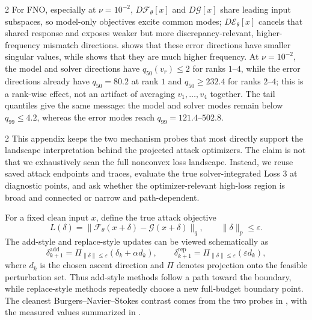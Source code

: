 \begin{multicols}{2}
For FNO, especially at $\nu=10^{-2}$, $D\mathcal{F}_\theta[x]$ and
$D\mathcal{G}[x]$ share leading input subspaces, so model-only objectives excite
common modes; $D\mathcal{E}_\theta[x]$ cancels that shared response and exposes
weaker but more discrepancy-relevant, higher-frequency mismatch directions.
 shows that these error directions have
smaller singular values, while  shows that they
are much higher frequency. At $\nu=10^{-2}$, the model and solver directions have
$q_{50}(v_r)\le 2$ for ranks $1$--$4$, while the error directions already have
$q_{50}=80.2$ at rank $1$ and $q_{50}\ge 232.4$ for ranks $2$--$4$; this is a
rank-wise effect, not an artifact of averaging $v_1,\ldots,v_4$ together. The
tail quantiles give the same message: the model and solver modes remain below
$q_{99}\le4.2$, whereas the error modes reach $q_{99}=121.4$--$502.8$.
\end{multicols}

\clearpage
{}

\begin{multicols}{2}
This appendix keeps the two mechanism probes that most directly support the
landscape interpretation behind the projected attack optimizers.  The claim is
not that we exhaustively scan the full nonconvex loss landscape.  Instead, we
reuse saved attack endpoints and traces, evaluate the true solver-integrated
Loss 3 at diagnostic points, and ask whether the optimizer-relevant high-loss
region is broad and connected or narrow and path-dependent.

For a fixed clean input \(x\), define the true attack objective
\[
  L(\delta)
  =
  \|\mathcal{F}_{\theta}(x+\delta)-\mathcal{G}(x+\delta)\|_q ,
  \qquad
  \|\delta\|_p\le \varepsilon .
\]
The add-style and replace-style updates can be viewed schematically as
\[
  \delta^{\mathrm{add}}_{k+1}
  =
  \Pi_{\|\delta\|\le\varepsilon}(\delta_k+\alpha d_k),
  \qquad
  \delta^{\mathrm{rep}}_{k+1}
  =
  \Pi_{\|\delta\|\le\varepsilon}(\varepsilon d_k),
\]
where \(d_k\) is the chosen ascent direction and \(\Pi\) denotes projection onto
the feasible perturbation set.  Thus add-style methods follow a path toward the
boundary, while replace-style methods repeatedly choose a new full-budget
boundary point.  The cleanest Burgers--Navier--Stokes contrast comes from the
two probes in , with the
measured values summarized in .
\end{multicols}

